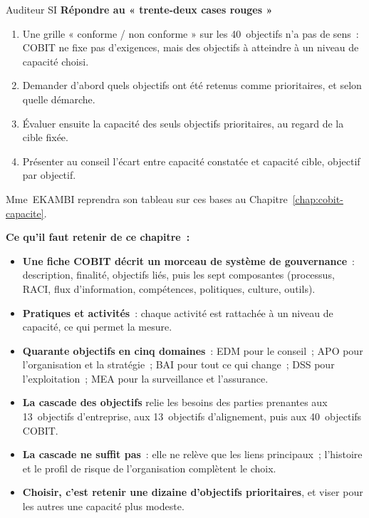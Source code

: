 \begin{boxmetier}{Auditeur SI}
\textbf{Répondre au « trente-deux cases rouges »}
\begin{enumerate}
    \item Une grille « conforme / non conforme » sur les 40~objectifs n'a
          pas de sens~: COBIT ne fixe pas d'exigences, mais des objectifs à
          atteindre à un niveau de capacité choisi.
    \item Demander d'abord quels objectifs ont été retenus comme
          prioritaires, et selon quelle démarche.
    \item Évaluer ensuite la capacité des seuls objectifs prioritaires, au
          regard de la cible fixée.
    \item Présenter au conseil l'écart entre capacité constatée et capacité
          cible, objectif par objectif.
\end{enumerate}
Mme~EKAMBI reprendra son tableau sur ces bases au Chapitre~\ref{chap:cobit-capacite}.
\end{boxmetier}

\separateur

\begin{boxresume}
\textbf{Ce qu'il faut retenir de ce chapitre~:}
\begin{itemize}
    \item \textbf{Une fiche COBIT décrit un morceau de système de
          gouvernance}~: description, finalité, objectifs liés, puis les
          sept composantes (processus, RACI, flux d'information,
          compétences, politiques, culture, outils).
    \item \textbf{Pratiques et activités}~: chaque activité est rattachée à
          un niveau de capacité, ce qui permet la mesure.
    \item \textbf{Quarante objectifs en cinq domaines}~: EDM pour le
          conseil~; APO pour l'organisation et la stratégie~; BAI pour tout
          ce qui change~; DSS pour l'exploitation~; MEA pour la surveillance
          et l'assurance.
    \item \textbf{La cascade des objectifs} relie les besoins des parties
          prenantes aux 13~objectifs d'entreprise, aux 13~objectifs
          d'alignement, puis aux 40~objectifs COBIT.
    \item \textbf{La cascade ne suffit pas}~: elle ne relève que les liens
          principaux~; l'histoire et le profil de risque de l'organisation
          complètent le choix.
    \item \textbf{Choisir, c'est retenir une dizaine d'objectifs
          prioritaires}, et viser pour les autres une capacité plus
          modeste.
\end{itemize}
\end{boxresume}

